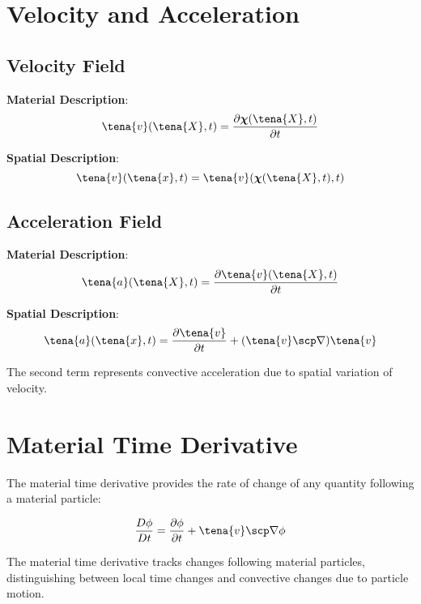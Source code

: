 \section{Velocity and Acceleration}

\subsection{Velocity Field}

\textbf{Material Description}:
\begin{equation}
\tena{v}(\tena{X}, t) = \frac{\partial \boldsymbol{\chi}(\tena{X}, t)}{\partial t}
\end{equation}

\textbf{Spatial Description}:
\begin{equation}
\tena{v}(\tena{x}, t) = \tena{v}(\boldsymbol{\chi}(\tena{X}, t), t)
\end{equation}

\subsection{Acceleration Field}

\textbf{Material Description}:
\begin{equation}
\tena{a}(\tena{X}, t) = \frac{\partial \tena{v}(\tena{X}, t)}{\partial t}
\end{equation}

\textbf{Spatial Description}:
\begin{equation}
\tena{a}(\tena{x}, t) = \frac{\partial \tena{v}}{\partial t} + (\tena{v} \scp \nabla)\tena{v}
\end{equation}

The second term represents convective acceleration due to spatial variation of velocity.

\section{Material Time Derivative}

The material time derivative provides the rate of change of any quantity following a material particle:

\begin{equation}
\frac{D\phi}{Dt} = \frac{\partial \phi}{\partial t} + \tena{v} \scp \nabla \phi
\end{equation}

\begin{keypoint}
The material time derivative tracks changes following material particles, distinguishing between local time changes and convective changes due to particle motion.
\end{keypoint}


